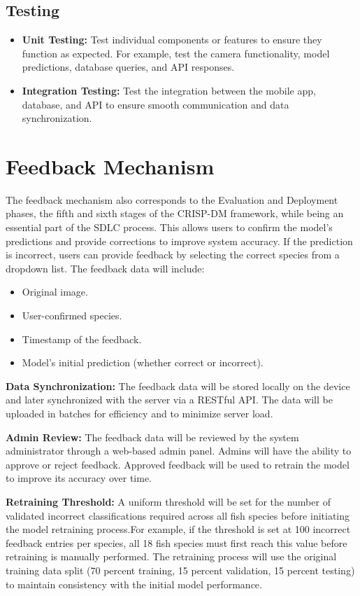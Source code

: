 \subsection{Testing}
\begin{itemize}
 \item \textbf{Unit Testing:} Test individual components or features to ensure they function as expected. For example, test the camera functionality, model predictions, database queries, and API responses.
 \item \textbf{Integration Testing:} Test the integration between the mobile app, database, and API to ensure smooth communication and data synchronization.
\end{itemize}

\section{Feedback Mechanism}
The feedback mechanism also corresponds to the Evaluation and Deployment phases, the fifth and sixth stages of the CRISP-DM framework, while being an essential part of the SDLC process. This allows users to confirm the model’s predictions and provide corrections to improve system accuracy. If the prediction is incorrect, users can provide feedback by selecting the correct species from a dropdown list. The feedback data will include:

\begin{itemize}
 \item Original image.
 \item User-confirmed species.
 \item Timestamp of the feedback.
 \item Model’s initial prediction (whether correct or incorrect).
\end{itemize}

\textbf{Data Synchronization:} The feedback data will be stored locally on the device and later synchronized with the server via a RESTful API. The data will be uploaded in batches for efficiency and to minimize server load.

\textbf{Admin Review:} The feedback data will be reviewed by the system administrator through a web-based admin panel. Admins will have the ability to approve or reject feedback. Approved feedback will be used to retrain the model to improve its accuracy over time.
 
\textbf{Retraining Threshold:} A uniform threshold will be set for the number of validated incorrect classifications required across all fish species before initiating the model retraining process.For example, if the threshold is set at 100 incorrect feedback entries per species, all 18 fish species must first reach this value before retraining is manually performed. The retraining process will use the original training data split (70 percent training, 15 percent validation, 15 percent testing) to maintain consistency with the initial model performance.

